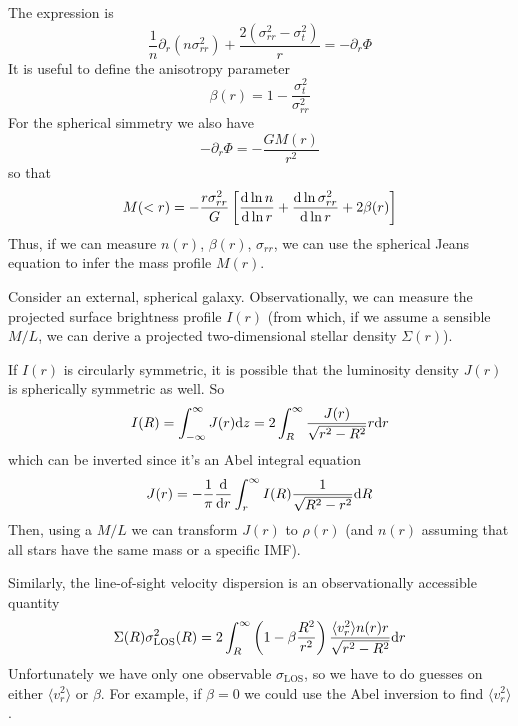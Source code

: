 The expression is
\begin{equation}
    \frac{1}{n}\partial_{r}(n\sigma_{rr}^{2})+\frac{2(\sigma_{rr}^{2}-\sigma_{t}^{2})}{r} = -\partial_{r}\Phi
    \label{eq:jeans_spherical}
\end{equation}
It is useful to define the anisotropy parameter
\begin{equation}
    \beta(r) = 1-\frac{\sigma_{t}^{2}}{\sigma_{rr}^{2}}
\end{equation}
For the spherical simmetry we also have
\begin{equation*}
    -\partial_{r}\Phi = -\frac{GM(r)}{r^{2}}
\end{equation*}
so that 
\begin{equation}
    M(<r) = -\frac{r\sigma_{rr}^{2}}{G}\left[\frac{\text{d}\ln n}{\text{d}\ln r}+\frac{\text{d}\ln\sigma_{rr}^{2}}{\text{d}\ln r}+2\beta(r)\right]
\end{equation}
Thus, if we can measure $n(r)$, $\beta(r)$, $\sigma_{rr}$, we can use the spherical Jeans equation to infer the mass profile $M(r)$.
\par Consider an external, spherical galaxy. Observationally, we can measure the projected surface brightness profile $I(r)$ (from which, if we assume a sensible $M/L$, we can derive a projected two-dimensional stellar density $\Sigma(r)$).
\par If $I(r)$ is circularly symmetric, it is possible that the luminosity density $J(r)$ is spherically symmetric as well. So
\begin{equation*}
    I(R) = \int_{-\infty}^{\infty}J(r)\text{d}z = 2\int_{R}^{\infty}\frac{J(r)}{\sqrt{r^{2}-R^{2}}}r\text{d}r
\end{equation*}
which can be inverted since it's an Abel integral equation
\begin{equation*}
    J(r) = -\frac{1}{\pi}\frac{\text{d}}{\text{d}r}\int_{r}^{\infty}I(R)\frac{1}{\sqrt{R^{2}-r^{2}}}\text{d}R
\end{equation*}
Then, using a $M/L$ we can transform $J(r)$ to $\rho(r)$ (and $n(r)$ assuming that all stars have the same mass or a specific IMF).
\par Similarly, the line-of-sight velocity dispersion is an observationally accessible quantity
\begin{equation*}
    \Sigma(R)\sigma_{\text{LOS}}^{2}(R) = 2\int_{R}^{\infty}\left(1-\beta\frac{R^{2}}{r^{2}}\right)\frac{\langle v_{r}^{2}\rangle n(r)r}{\sqrt{r^{2}-R^{2}}}\text{d}r
\end{equation*}
Unfortunately we have only one observable $\sigma_{\text{LOS}}$, so we have to do guesses on either $\langle v_{r}^{2}\rangle$ or $\beta$. For example, if $\beta = 0$ we could use the Abel inversion to find $\langle v_{r}^{2}\rangle$.
